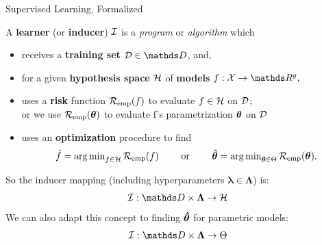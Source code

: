 \documentclass[11pt,compress,t,notes=noshow, xcolor=table]{beamer}
\begin{document}
\begin{vbframe}{Supervised Learning, Formalized}

A \textbf{learner} (or \textbf{inducer}) $\mathcal{I}$ is a \emph{program} or 
\emph{algorithm} which

\begin{itemize}

  \item receives a \textbf{training set} $\D \in \allDatasets$, and,
  
  \item for a given \textbf{hypothesis space} $\mathcal{H}$ of \textbf{models} 
  $f:\Xspace \rightarrow \R^g,$ 
  
  \item uses a \textbf{risk} function $\mathcal{R}_{\text{emp}}(f)$ to evaluate $f \in \mathcal{H}$ on $\mathcal{D}$;\\ 
  or we use $\mathcal{R}_{\text{emp}}(\bm{\theta})$ to evaluate f's parametrization $\bm{\theta}$ on $\mathcal{D}$
  
  \item uses an \textbf{optimization} procedure to find
      $$\hat{f} = \operatorname{arg\,min}_{f \in \mathcal{H}} \mathcal{R}_{\text{emp}}(f) \qquad \text{ or } \qquad \bm{\hat\theta} = \operatorname{arg\,min}_{\bm{\theta} \in \Theta} \mathcal{R}_{\text{emp}}(\bm{\theta}).$$

\end{itemize}
So the inducer mapping (including hyperparameters $\bm{\lambda} \in \bm{\Lambda}$) is:
\[\ind: \preimageInducerShort\rightarrow \Hspace\]
We can also adapt this concept to finding $\bm{\hat\theta}$ for parametric
models:
\[\ind: \preimageInducerShort \rightarrow \Theta\]






\end{vbframe}



\end{document}
